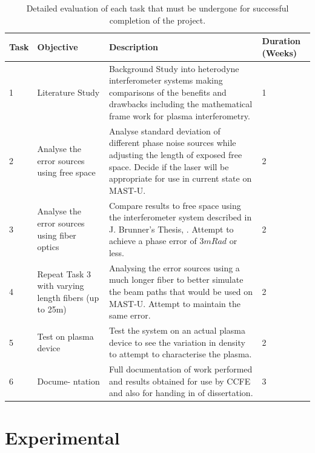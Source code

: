 \documentclass[12pt,a4paper,oneside]{report}
\begin{document}
\begin{center}
\begin{table}[H]
	\setlength\arrayrulewidth{1pt}
    \begin{tabular}{|p{1cm}|p{2.5cm}|p{9cm}|p{1.5cm}|}
    			\hline
    	        Task & Objective & Description & Duration (Weeks)\\
                \hline
                1 & Literature Study & Background Study into heterodyne interferometer systems making comparisons of the benefits and drawbacks including the mathematical frame work for plasma interferometry. & 1\\
                \hline
                2 & Analyse the error sources using free space& Analyse standard deviation of different phase noise sources while adjusting the length of exposed free space. Decide if the laser will be appropriate for use in current state on MAST-U.  & 2\\
                \hline
                3 & Analyse the error sources using fiber optics& Compare results to free space using the interferometer system described in J. Brunner's Thesis, \autocite{Brunner2017}. Attempt to achieve a phase error of 3$mRad$ or less.& 2\\
                \hline
                4 & Repeat Task 3 with varying length fibers (up to 25m)& Analysing the error sources using a much longer fiber to better simulate the beam paths that would be used on MAST-U. Attempt to maintain the same error. & 2\\
                \hline
                5 & Test on plasma device & Test the system on an actual plasma device to see the variation in density to attempt to characterise the plasma. & 2\\
                \hline
                6 & Docume- ntation & Full documentation of work performed and results obtained for use by CCFE and also for handing in of dissertation. & 3\\
        \hline
	\end{tabular}
    \caption{Detailed evaluation of each task that must be undergone for successful completion of the project.}
    \label{tbl:tasks}
\end{table}
\end{center}

\chapter{Experimental}
\end{document}
